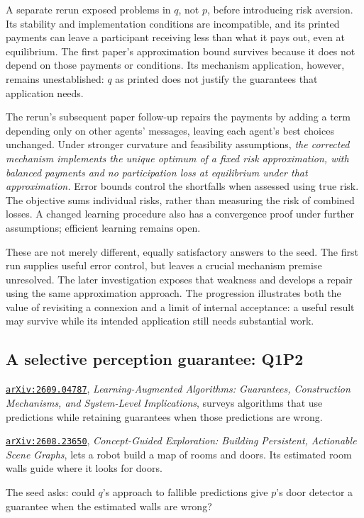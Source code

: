 \documentclass[11pt,a4paper]{article}
\renewenvironment{quote}{\tcolorbox[pairpanel]}{\endtcolorbox}
\newcommand{\pl}[1]{\noindent\llap{\makebox[1.5em][l]{\color{accent}\(#1\)}}}
\newcommand{\file}[1]{\texttt{#1}}
\begin{document}
A separate rerun exposed problems in \(q\), not \(p\), before introducing risk
aversion. Its stability and implementation conditions are incompatible, and its
printed payments can leave a participant receiving less than what it pays out,
even at equilibrium. The first paper's approximation bound survives because it
does not depend on those payments or conditions. Its mechanism application,
however, remains unestablished: \(q\) as printed does not justify the guarantees
that application needs.

The rerun's subsequent paper follow-up repairs the payments by adding a term
depending only on other agents' messages, leaving each agent's best choices
unchanged. Under stronger curvature and feasibility assumptions, \emph{the
corrected mechanism implements the unique optimum of a fixed risk approximation,
with balanced payments and no participation loss at equilibrium under that
approximation.} Error bounds control the shortfalls when assessed using true
risk. The objective sums individual risks, rather than measuring the risk of
combined losses. A changed learning procedure also has a convergence proof under
further assumptions; efficient learning remains open.

These are not merely different, equally satisfactory answers to the seed. The
first run supplies useful error control, but leaves a crucial mechanism premise
unresolved. The later investigation exposes that weakness and develops a repair
using the same approximation approach. The progression illustrates both the
value of revisiting a connexion and a limit of internal acceptance: a useful
result may survive while its intended application still needs substantial work.


\subsection{A selective perception guarantee: Q1P2}

\begin{quote}
\pl{q}\href{https://arxiv.org/abs/2609.04787}{\file{arXiv:2609.04787}},
\emph{Learning-Augmented Algorithms: Guarantees, Construction Mechanisms, and
System-Level Implications}, surveys algorithms that use predictions while
retaining guarantees when those predictions are wrong.

\pl{p}\href{https://arxiv.org/abs/2608.23650}{\file{arXiv:2608.23650}},
\emph{Concept-Guided Exploration: Building Persistent, Actionable Scene Graphs},
lets a robot build a map of rooms and doors. Its estimated room walls guide
where it looks for doors.

The seed asks: could \(q\)'s approach to fallible predictions give \(p\)'s
door detector a guarantee when the estimated walls are wrong?
\end{quote}
\end{document}
